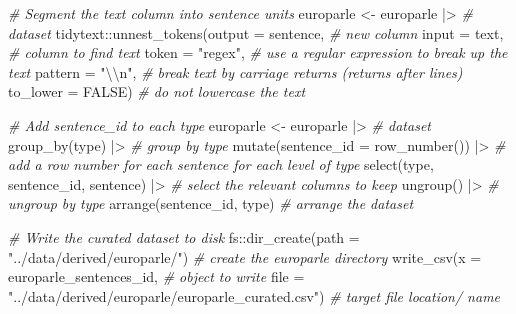 \documentclass[
  letterpaper,
  DIV=11,
  numbers=noendperiod]{scrreport}
\newenvironment{Shaded}{\begin{snugshade}}{\end{snugshade}}
\newcommand{\AttributeTok}[1]{\textcolor[rgb]{0.00,0.00,0.00}{#1}}
\newcommand{\CommentTok}[1]{\textcolor[rgb]{0.00,0.00,0.00}{\textit{#1}}}
\newcommand{\ConstantTok}[1]{\textcolor[rgb]{0.00,0.00,0.00}{#1}}
\newcommand{\FunctionTok}[1]{\textcolor[rgb]{0.00,0.00,0.00}{#1}}
\newcommand{\NormalTok}[1]{\textcolor[rgb]{0.00,0.00,0.00}{#1}}
\newcommand{\OtherTok}[1]{\textcolor[rgb]{0.00,0.00,0.00}{#1}}
\newcommand{\SpecialCharTok}[1]{\textcolor[rgb]{0.00,0.00,0.00}{#1}}
\newcommand{\StringTok}[1]{\textcolor[rgb]{0.00,0.00,0.00}{#1}}
\theoremstyle{definition}
\theoremstyle{remark}
\begin{document}
\begin{Shaded}
\begin{Highlighting}[]
\CommentTok{\# Segment the \textasciigrave{}text\textasciigrave{} column into \textasciigrave{}sentence\textasciigrave{} units}
\NormalTok{europarle }\OtherTok{\textless{}{-}} 
\NormalTok{  europarle }\SpecialCharTok{|\textgreater{}} \CommentTok{\# dataset}
\NormalTok{  tidytext}\SpecialCharTok{::}\FunctionTok{unnest\_tokens}\NormalTok{(}\AttributeTok{output =}\NormalTok{ sentence, }\CommentTok{\# new column}
                          \AttributeTok{input =}\NormalTok{ text, }\CommentTok{\# column to find text}
                          \AttributeTok{token =} \StringTok{"regex"}\NormalTok{, }\CommentTok{\# use a regular expression to break up the text}
                          \AttributeTok{pattern =} \StringTok{"}\SpecialCharTok{\textbackslash{}\textbackslash{}}\StringTok{n"}\NormalTok{, }\CommentTok{\# break text by carriage returns (returns after lines)}
                          \AttributeTok{to\_lower =} \ConstantTok{FALSE}\NormalTok{) }\CommentTok{\# do not lowercase the text}

\CommentTok{\# Add \textasciigrave{}sentence\_id\textasciigrave{} to each \textasciigrave{}type\textasciigrave{}}
\NormalTok{europarle }\OtherTok{\textless{}{-}} 
\NormalTok{  europarle }\SpecialCharTok{|\textgreater{}} \CommentTok{\# dataset}
  \FunctionTok{group\_by}\NormalTok{(type) }\SpecialCharTok{|\textgreater{}} \CommentTok{\# group by type}
  \FunctionTok{mutate}\NormalTok{(}\AttributeTok{sentence\_id =} \FunctionTok{row\_number}\NormalTok{()) }\SpecialCharTok{|\textgreater{}} \CommentTok{\# add a row number for each sentence for each level of type}
  \FunctionTok{select}\NormalTok{(type, sentence\_id, sentence) }\SpecialCharTok{|\textgreater{}} \CommentTok{\# select the relevant columns to keep}
  \FunctionTok{ungroup}\NormalTok{() }\SpecialCharTok{|\textgreater{}}  \CommentTok{\# ungroup by type}
  \FunctionTok{arrange}\NormalTok{(sentence\_id, type) }\CommentTok{\# arrange the dataset}

\CommentTok{\# Write the curated dataset to disk}
\NormalTok{fs}\SpecialCharTok{::}\FunctionTok{dir\_create}\NormalTok{(}\AttributeTok{path =} \StringTok{"../data/derived/europarle/"}\NormalTok{) }\CommentTok{\# create the europarle directory}
\FunctionTok{write\_csv}\NormalTok{(}\AttributeTok{x =}\NormalTok{ europarle\_sentences\_id, }\CommentTok{\# object to write}
          \AttributeTok{file =} \StringTok{"../data/derived/europarle/europarle\_curated.csv"}\NormalTok{) }\CommentTok{\# target file location/ name}
\end{Highlighting}
\end{Shaded}
\end{document}

